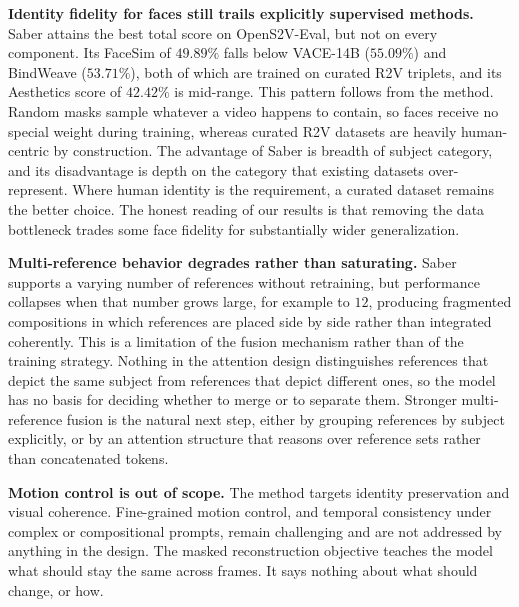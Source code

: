 \noindent \textbf{Identity fidelity for faces still trails explicitly supervised methods.}
Saber attains the best total score on OpenS2V-Eval, but not on every component. Its FaceSim of $49.89\%$ falls below VACE-14B ($55.09\%$) and BindWeave ($53.71\%$), both of which are trained on curated R2V triplets, and its Aesthetics score of $42.42\%$ is mid-range. This pattern follows from the method. Random masks sample whatever a video happens to contain, so faces receive no special weight during training, whereas curated R2V datasets are heavily human-centric by construction. The advantage of Saber is breadth of subject category, and its disadvantage is depth on the category that existing datasets over-represent. Where human identity is the requirement, a curated dataset remains the better choice. The honest reading of our results is that removing the data bottleneck trades some face fidelity for substantially wider generalization.

\noindent \textbf{Multi-reference behavior degrades rather than saturating.}
Saber supports a varying number of references without retraining, but performance collapses when that number grows large, for example to $12$, producing fragmented compositions in which references are placed side by side rather than integrated coherently. This is a limitation of the fusion mechanism rather than of the training strategy. Nothing in the attention design distinguishes references that depict the same subject from references that depict different ones, so the model has no basis for deciding whether to merge or to separate them. Stronger multi-reference fusion is the natural next step, either by grouping references by subject explicitly, or by an attention structure that reasons over reference sets rather than concatenated tokens.

\noindent \textbf{Motion control is out of scope.}
The method targets identity preservation and visual coherence. Fine-grained motion control, and temporal consistency under complex or compositional prompts, remain challenging and are not addressed by anything in the design. The masked reconstruction objective teaches the model what should stay the same across frames. It says nothing about what should change, or how.

